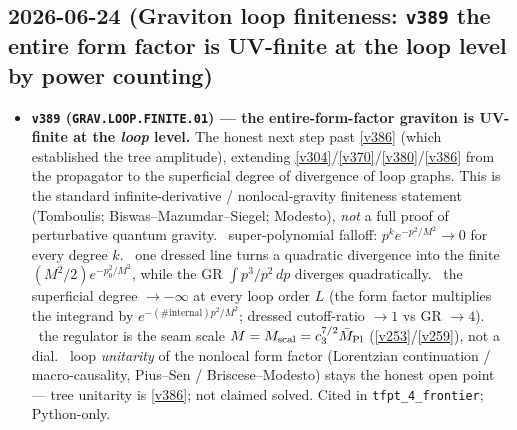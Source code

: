 \subsection*{2026-06-24 (Graviton loop finiteness: \texttt{v389} the entire form factor is UV-finite at the loop level by power counting)}
\begin{itemize}
\item \textbf{\texttt{v389} (\texttt{GRAV.LOOP.FINITE.01}) --- the entire-form-factor graviton is UV-finite at the \emph{loop} level.}
The honest next step past \vref{v386} (which established the tree amplitude), extending \vref{v304}/\vref{v370}/\vref{v380}/\vref{v386}
from the propagator to the superficial degree of divergence of loop graphs. This is the standard infinite-derivative /
nonlocal-gravity finiteness statement (Tomboulis; Biswas--Mazumdar--Siegel; Modesto), \emph{not} a full proof of
perturbative quantum gravity. \mE\ super-polynomial falloff: $p^k e^{-p^2/M^2}\to0$ for every degree $k$. \mE\ one dressed
line turns a quadratic divergence into the finite $(M^2/2)e^{-p_0^2/M^2}$, while the GR $\int p^3/p^2\,dp$ diverges
quadratically. \mE\ the superficial degree $\to-\infty$ at every loop order $L$ (the form factor multiplies the integrand by
$e^{-(\#\mathrm{internal})p^2/M^2}$; dressed cutoff-ratio $\to1$ vs GR $\to4$). \mE\ the regulator is the seam scale
$M=M_{\mathrm{scal}}=c_3^{7/2}\bar M_{\mathrm{Pl}}$ (\vref{v253}/\vref{v259}), not a dial. \mC\mO\ loop \emph{unitarity} of the nonlocal
form factor (Lorentzian continuation / macro-causality, Pius--Sen / Briscese--Modesto) stays the honest open point --- tree
unitarity is \vref{v386}; not claimed solved. Cited in \texttt{tfpt\_4\_frontier}; Python-only.
\end{itemize}

